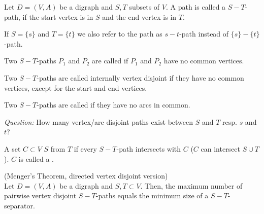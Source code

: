 \begin{lec}[2011-12-01]\end{lec}



\begin{defn}
Let $D = (V, A)$ be a digraph and $S, T$ subsets of $V$.
A path is called a $S-T$-path, if the start vertex is in $S$ and the end
vertex is in $T$.

If $S = \{s\}$ and $T = \{t\}$ we also refer to the path as $s-t$-path
instead of $\{s\}-\{t\}$-path.
\end{defn}

\begin{defn}
Two $S-T$-paths $P_1$ and $P_2$ are called
 if $P_1$ and $P_2$ have no common
vertices.

Two $S-T$-paths are called internally vertex disjoint if they have no common
vertices, except for the start and end vertices.

Two $S-T$-paths are called  if they have no
arcs in common.
\end{defn}
\emph{Question:} How many vertex/arc disjoint paths exist between $S$ and
$T$ resp. $s$ and $t$?

\begin{defn} 
A set $C \subset V$  $S$ from $T$ if every
$S-T$-path intersects with $C$ ($C$ can intersect $S \cup T$). $C$ is called
a . 
\end{defn}

\begin{thm}(Menger's Theorem, directed vertex disjoint version)\\
Let $D=(V,A)$ be a digraph and $S,T \subset V$. Then, the maximum number of
pairwise vertex disjoint $S-T$-paths equals the minimum size of a
$S-T$-separator.
\end{thm}

